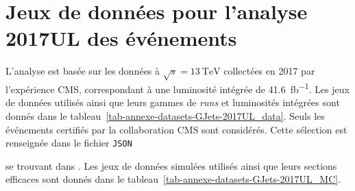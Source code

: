 \section{Jeux de données pour l'analyse 2017UL des événements \Gjets}
L'analyse est basée sur les données à $\sqrt{s}=\SI{13}{\TeV}$ collectées en 2017 par l'expérience CMS, correspondant à une luminosité intégrée de \SI{41.6}{\femto\barn^{-1}}.
Les jeux de données utilisés ainsi que leurs gammes de \emph{runs} et luminosités intégrées sont donnés dans le tableau~\ref{tab-annexe-datasets-GJets-2017UL_data}.
Seuls les événements certifiés par la collaboration CMS sont considérés. Cette sélection est renseignée dans le fichier \texttt{JSON}
\begin{center}
\end{center}
se trouvant dans .
Les jeux de données simulées utilisés ainsi que leurs sections efficaces sont donnés dans le tableau~\ref{tab-annexe-datasets-GJets-2017UL_MC}.

